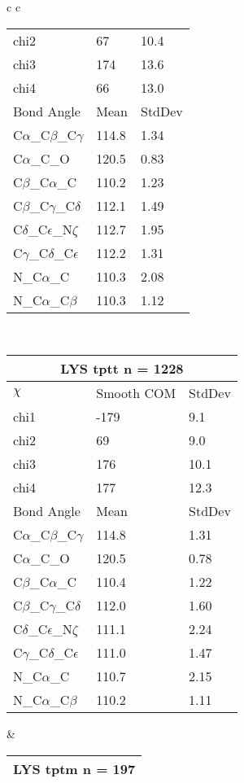 \begin{longtable}{ c c }
\begin{tabular}{ l l l }
  chi2 & 67 & 10.4 \\ 
  chi3 & 174 & 13.6 \\ 
  chi4 & 66 & 13.0 \\ \midrule
  Bond Angle   & Mean     & StdDev \\ \midrule
  C$\alpha$\_C$\beta$\_C$\gamma$ & 114.8 & 1.34\\
  C$\alpha$\_C\_O & 120.5 & 0.83\\
  C$\beta$\_C$\alpha$\_C & 110.2 & 1.23\\
  C$\beta$\_C$\gamma$\_C$\delta$ & 112.1 & 1.49\\
  C$\delta$\_C$\epsilon$\_N$\zeta$ & 112.7 & 1.95\\
  C$\gamma$\_C$\delta$\_C$\epsilon$ & 112.2 & 1.31\\
  N\_C$\alpha$\_C & 110.3 & 2.08\\
  N\_C$\alpha$\_C$\beta$ & 110.3 & 1.12\\
  \bottomrule
  \end{tabular}
  \\
  \begin{tabular}{ l l l }
  \toprule
  \multicolumn{3}{c}{LYS \textbf{tptt} n = 1228} \\ \toprule
  $\chi$       & Smooth COM & StdDev \\ \midrule
  chi1 & -179 & 9.1 \\ 
  chi2 & 69 & 9.0 \\ 
  chi3 & 176 & 10.1 \\ 
  chi4 & 177 & 12.3 \\ \midrule
  Bond Angle   & Mean     & StdDev \\ \midrule
  C$\alpha$\_C$\beta$\_C$\gamma$ & 114.8 & 1.31\\
  C$\alpha$\_C\_O & 120.5 & 0.78\\
  C$\beta$\_C$\alpha$\_C & 110.4 & 1.22\\
  C$\beta$\_C$\gamma$\_C$\delta$ & 112.0 & 1.60\\
  C$\delta$\_C$\epsilon$\_N$\zeta$ & 111.1 & 2.24\\
  C$\gamma$\_C$\delta$\_C$\epsilon$ & 111.0 & 1.47\\
  N\_C$\alpha$\_C & 110.7 & 2.15\\
  N\_C$\alpha$\_C$\beta$ & 110.2 & 1.11\\
  \bottomrule
  \end{tabular}
  &
  \begin{tabular}{ l l l }
  \toprule
  \multicolumn{3}{c}{LYS \textbf{tptm} n = 197} \\ \toprule

\end{tabular}
\end{longtable}
